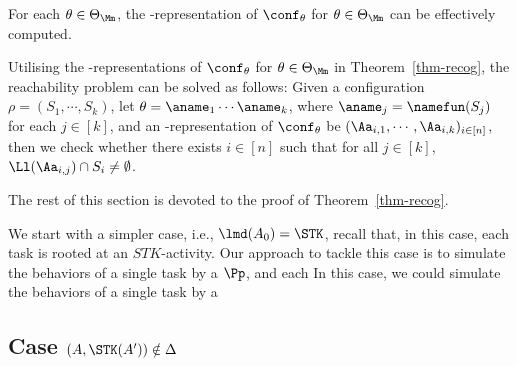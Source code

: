 \begin{theorem}\label{thm-recog}
    For each $\theta \in \Theta_\Mm$, the {\NFA}-representation of $\conf_\theta$ for $\theta \in \Theta_\Mm$ can be effectively computed.
\end{theorem} 

Utilising the {\NFA}-representations of $\conf_\theta$ for $\theta \in \Theta_\Mm$ in Theorem~\ref{thm-recog}, the reachability problem can be solved as follows: Given a configuration $\rho = (S_1, \cdots, S_k)$, let $\theta = \aname_1 \cdots \aname_k$, where $\aname_j=\namefun(S_j)$ for each $j \in [k]$, and an {\NFA}-representation of $\conf_\theta$ be $(\Aa_{i,1},\cdots,\Aa_{i,k})_{i \in [n]}$, then we check whether there exists $i \in [n]$ such that  for all $j \in [k]$, 
$\Ll(\Aa_{i,j})\cap S_i\neq\emptyset$.

The rest of this section is devoted to the proof of Theorem~\ref{thm-recog}.



We start with a simpler case, i.e., $\lmd(A_0)=\STK$, recall that, in this case, each task is rooted at an $STK$-activity. 
Our approach to tackle this case is to simulate the behaviors of a single task by a {\PDS} $\Pp$, and each 
In this case, we could simulate the behaviors of a single task by a {\PDS}

\subsection{Case $(A,\STK(A'))\notin\Delta$}\label{sec:singletask}

